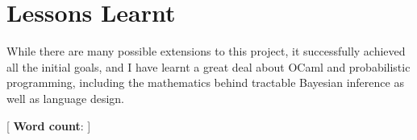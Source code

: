 \section{Lessons Learnt}
While there are many possible extensions to this project, it successfully achieved all the initial goals, and I have learnt a great deal about OCaml and probabilistic programming, including the mathematics behind tractable Bayesian inference as well as language design.

\mbox{}
\vfill
[ {\small \textbf{Word count}: }]
